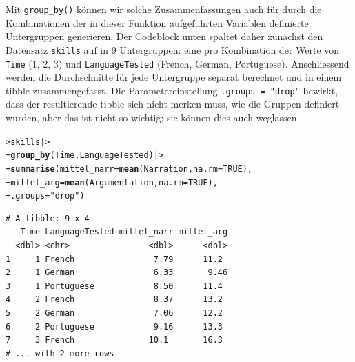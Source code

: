 \documentclass[oneside, 10pt]{book}\usepackage[]{graphicx}\usepackage[]{xcolor}
\makeatletter
\newcommand{\hlnum}[1]{\textcolor[rgb]{0.686,0.059,0.569}{#1}}%
\newcommand{\hlstr}[1]{\textcolor[rgb]{0.192,0.494,0.8}{#1}}%
\newcommand{\hlstd}[1]{\textcolor[rgb]{0.345,0.345,0.345}{#1}}%
\newcommand{\hlkwc}[1]{\textcolor[rgb]{0.333,0.667,0.333}{#1}}%
\newcommand{\hlkwd}[1]{\textcolor[rgb]{0.737,0.353,0.396}{\textbf{#1}}}%
\newenvironment{kframe}{%
 \def\at@end@of@kframe{}%
 \ifinner\ifhmode%
  \def\at@end@of@kframe{\end{minipage}}%
  \begin{minipage}{\columnwidth}%
 \fi\fi%
 \def\FrameCommand##1{\hskip\@totalleftmargin \hskip-\fboxsep
 \colorbox{shadecolor}{##1}\hskip-\fboxsep
     \hskip-\linewidth \hskip-\@totalleftmargin \hskip\columnwidth}%
 \MakeFramed {\advance\hsize-\width
   \@totalleftmargin\z@ \linewidth\hsize
   \@setminipage}}%
 {\par\unskip\endMakeFramed%
 \at@end@of@kframe}
\newenvironment{knitrout}{}{} %
\makeatother
\begin{document}
Mit \texttt{group\_by()} können wir solche Zusammenfassungen
auch für durch die Kombinationen der in dieser Funktion
aufgeführten Variablen definierte Untergruppen generieren.
Der Codeblock unten spaltet daher zunächst den Datensatz
\texttt{skills} auf in 9 Untergruppen: eine pro Kombination
der Werte von \texttt{Time} (1, 2, 3) und \texttt{LanguageTested}
(French, German, Portuguese). Anschliessend werden die Durchschnitte
für jede Untergruppe separat berechnet und in einem tibble
zusammengefasst.
Die Parametereinstellung \texttt{.groups = "drop"} bewirkt,
dass der resultierende tibble sich nicht merken muss, wie die
Gruppen definiert wurden, aber das ist nicht so wichtig;
sie können dies auch weglassen.

\begin{knitrout}
\color{fgcolor}\begin{kframe}
\begin{alltt}
\hlstd{> }\hlstd{skills |>}
\hlstd{+ }  \hlkwd{group_by}\hlstd{(Time, LanguageTested) |>}
\hlstd{+ }  \hlkwd{summarise}\hlstd{(}\hlkwc{mittel_narr} \hlstd{=} \hlkwd{mean}\hlstd{(Narration,} \hlkwc{na.rm} \hlstd{=} \hlnum{TRUE}\hlstd{),}
\hlstd{+ }            \hlkwc{mittel_arg} \hlstd{=} \hlkwd{mean}\hlstd{(Argumentation,} \hlkwc{na.rm} \hlstd{=} \hlnum{TRUE}\hlstd{),}
\hlstd{+ }            \hlkwc{.groups} \hlstd{=} \hlstr{"drop"}\hlstd{)}
\end{alltt}
\begin{verbatim}
# A tibble: 9 x 4
   Time LanguageTested mittel_narr mittel_arg
  <dbl> <chr>                <dbl>      <dbl>
1     1 French                7.79      11.2 
2     1 German                6.33       9.46
3     1 Portuguese            8.50      11.4 
4     2 French                8.37      13.2 
5     2 German                7.06      12.2 
6     2 Portuguese            9.16      13.3 
7     3 French               10.1       16.3 
# ... with 2 more rows
\end{verbatim}
\end{kframe}
\end{knitrout}
% 
\end{document}

